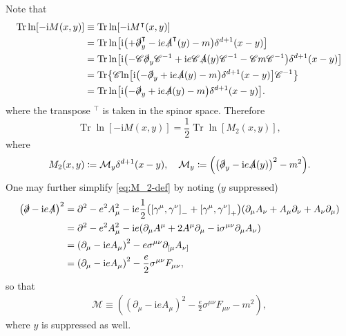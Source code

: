 \documentclass[12pt]{article}
\newcommand\mi{\mathrm{i}} %
\DeclareMathOperator{\Tr}{Tr}
\newcommand{\rbr}[1]{{\left(#1\right)}}
\newcommand{\sbr}[1]{{\left[#1\right]}}
\newcommand{\rfun}[2]{{#1}\mathopen{}\left(#2\right)\mathclose{}}
\newcommand{\sfun}[2]{{#1}\mathopen{}\left[#2\right]\mathclose{}}
\newcommand{\cfun}[2]{{#1}\mathopen{}\left\{#2\right\}\mathclose{}}
\begin{document}
Note that
\begin{align}
\Tr \sfun{\ln}{-\mi \rfun{M}{x, y}} &\equiv
\Tr \sfun{\ln}{-\mi \rfun{M^\intercal}{x, y}} \nonumber \\
&= \Tr \sfun{\ln}{\mi\rbr{ +\slashed{\partial}_y^\intercal -\mi e 
\rfun{\slashed{A}^\intercal}{y} - m}\rfun{\delta^{d+1}}{x-y}} \nonumber \\
&= \Tr \sfun{\ln}{\mi\rbr{ -\mathscr{C}\slashed{\partial}_y\mathscr{C}^{-1}
+\mi e \mathscr{C}\rfun{\slashed{A}}{y}\mathscr{C}^{-1}
-\mathscr{C}m\mathscr{C}^{-1}} \rfun{\delta^{d+1}}{x-y}} \nonumber \\
&= \cfun{\Tr}{\mathscr{C}\sfun{\ln}{\mi\rbr{-\slashed{\partial}_y
+\mi e \rfun{\slashed{A}}{y} -m} \rfun{\delta^{d+1}}{x-y}}\mathscr{C}^{-1}} 
\nonumber \\
&= \Tr \sfun{\ln}{\mi\rbr{-\slashed{\partial}_y
+\mi e \rfun{\slashed{A}}{y} -m} \rfun{\delta^{d+1}}{x-y}}.
\end{align}
where the transpose ${}^\intercal$ is taken in the spinor space. Therefore
\begin{equation}
\Tr \sfun{\ln}{-\mi \rfun{M}{x, y}} =
\frac{1}{2} \Tr \sfun{\ln}{\rfun{M_2}{x, y}},
\label{eq:Tr-M_2}
\end{equation}
where
\begin{align}
\rfun{M_2}{x, y} \coloneqq \mathcal{M}_y \rfun{\delta^{d+1}}{x-y},\quad
\mathcal{M}_y \coloneqq \rbr{\rbr{\slashed{\partial}_y-\mi e 
\rfun{\slashed{A}}{y}}^2 - m^2}.
\label{eq:M_2-def}
\end{align}
One may further simplify \cref{eq:M_2-def} by noting ($y$ suppressed)
\begin{align}
\rbr{\slashed{\partial} -\mi e \slashed{A}}^2 &=
\partial^2 - e^2 A_\mu^2 -\mi e \frac{1}{2}\rbr{\sbr{\gamma^\mu, \gamma^\nu}_- 
+ \sbr{\gamma^\mu, \gamma^\nu}_+}
\rbr{\partial_\mu A_\nu + A_\mu \partial_\nu + A_\nu \partial_\mu} 
\nonumber \\
&= \partial^2 - e^2 A_\mu^2 - \mi e \rbr{\partial_\mu A^\mu + 2A^\mu 
\partial_\mu - \mi \sigma^{\mu\nu} \partial_\mu A_\nu} \nonumber \\
&= \rbr{\partial_\mu - \mi e A_\mu}^2
- e \sigma^{\mu\nu} \partial_{[\mu} A_{\nu]} \nonumber \\
&= \rbr{\partial_\mu - \mi e A_\mu}^2 - \frac{e}{2} \sigma^{\mu\nu} F_{\mu\nu},
\end{align}
so that
\begin{align}
\mathcal{M} \equiv \rbr{\rbr{\partial_{\mu} - \mi e A_\mu}^2 - 
\frac{e}{2} \sigma^{\mu\nu} F_{\mu\nu} - m^2},
\label{eq:M_2-simp}
\end{align}
where $y$ is suppressed as well.
\end{document}

